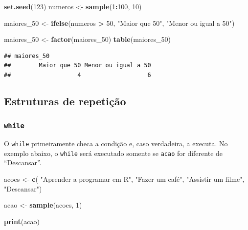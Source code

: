\documentclass[
]{book}
\newenvironment{Shaded}{\begin{snugshade}}{\end{snugshade}}
\newcommand{\DecValTok}[1]{\textcolor[rgb]{0.00,0.00,0.81}{#1}}
\newcommand{\FunctionTok}[1]{\textcolor[rgb]{0.13,0.29,0.53}{\textbf{#1}}}
\newcommand{\NormalTok}[1]{#1}
\newcommand{\OtherTok}[1]{\textcolor[rgb]{0.56,0.35,0.01}{#1}}
\newcommand{\SpecialCharTok}[1]{\textcolor[rgb]{0.81,0.36,0.00}{\textbf{#1}}}
\newcommand{\StringTok}[1]{\textcolor[rgb]{0.31,0.60,0.02}{#1}}
\begin{document}
\begin{Shaded}
\begin{Highlighting}[]
\FunctionTok{set.seed}\NormalTok{(}\DecValTok{123}\NormalTok{)}
\NormalTok{numeros }\OtherTok{\textless{}{-}} \FunctionTok{sample}\NormalTok{(}\DecValTok{1}\SpecialCharTok{:}\DecValTok{100}\NormalTok{, }\DecValTok{10}\NormalTok{)}

\NormalTok{maiores\_50 }\OtherTok{\textless{}{-}} \FunctionTok{ifelse}\NormalTok{(numeros }\SpecialCharTok{\textgreater{}} \DecValTok{50}\NormalTok{, }\StringTok{"Maior que 50"}\NormalTok{, }\StringTok{"Menor ou igual a 50"}\NormalTok{)}

\NormalTok{maiores\_50 }\OtherTok{\textless{}{-}} \FunctionTok{factor}\NormalTok{(maiores\_50)}
\FunctionTok{table}\NormalTok{(maiores\_50)}
\end{Highlighting}
\end{Shaded}

\begin{verbatim}
## maiores_50
##        Maior que 50 Menor ou igual a 50 
##                   4                   6
\end{verbatim}

\subsection{Estruturas de repetição}\label{estruturas-de-repetiuxe7uxe3o}

\subsubsection{\texorpdfstring{\texttt{while}}{while}}\label{while}

O \texttt{while} primeiramente checa a condição e, caso verdadeira, a executa.
No exemplo abaixo, o \texttt{while} será executado somente se \texttt{acao} for diferente de ``Descansar''.

\begin{Shaded}
\begin{Highlighting}[]
\NormalTok{acoes }\OtherTok{\textless{}{-}} \FunctionTok{c}\NormalTok{( }\StringTok{"Aprender a programar em R"}\NormalTok{,}
        \StringTok{"Fazer um café"}\NormalTok{,}
        \StringTok{"Assistir um filme"}\NormalTok{,}
        \StringTok{"Descansar"}\NormalTok{)}

\NormalTok{acao }\OtherTok{\textless{}{-}} \FunctionTok{sample}\NormalTok{(acoes, }\DecValTok{1}\NormalTok{)}

\FunctionTok{print}\NormalTok{(acao)}
\end{Highlighting}
\end{Shaded}
\end{document}
